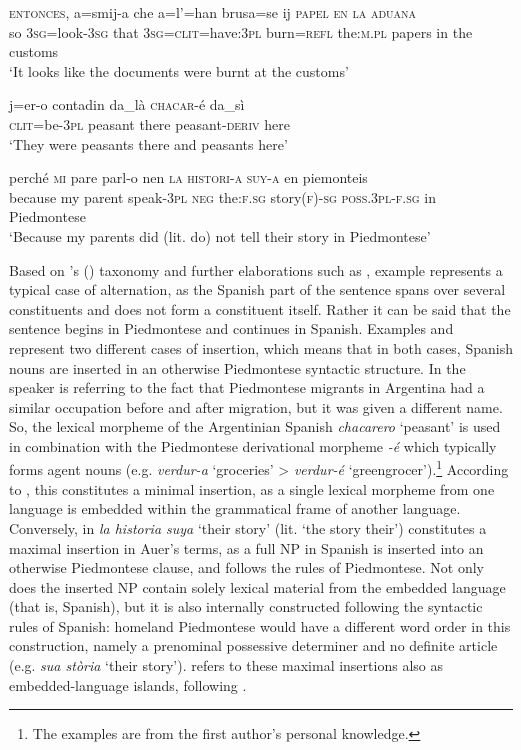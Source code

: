 \documentclass[output=paper]{langscibook}
\begin{document}
\ea\label{ex:goria:1}
  \gll \textsc{entonces}, a=smij-a che a=l'=han brusa=se ij \textsc{papel} \textsc{en} \textsc{la} \textsc{aduana}\\
  so \textsc{3sg}=look-\textsc{3sg} that  \textsc{3sg}=\textsc{clit}=have:\textsc{3pl}  burn=\textsc{refl} the:\textsc{m.pl} papers in the customs\\
  \glt ‘It looks like the documents were burnt at the customs’
\z

\ea\label{ex:goria:2}
  \gll j=er-o contadin da\_là \textsc{chacar}{}-é da\_sì\\
  \textsc{clit}=be-\textsc{3pl} peasant there peasant-\textsc{deriv} here\\
  \glt ‘They were peasants there and peasants here’
\z

\ea\label{ex:goria:3}
  \gll perché \textsc{mi} pare parl-o nen \textsc{la} \textsc{histori-a} \textsc{suy-a} en  piemonteis\\
  because my parent speak-\textsc{3pl} \textsc{neg} the:\textsc{f.sg} story(\textsc{f})-\textsc{sg}  \textsc{poss.3pl-f.sg} in Piedmontese\\
  \glt ‘Because my parents did (lit. do) not tell their story in Piedmontese’
\z

Based on \citeauthor{Muysken2000}'s (\citeyear{Muysken2000,Muysken2013}) taxonomy and further elaborations such as \citet{DeucharEtAl2007}, example  represents a typical case of alternation, as the Spanish part of the sentence spans over several constituents and does not form a constituent itself. Rather it can be said that the sentence begins in Piedmontese and continues in Spanish. Examples  and  represent two different cases of insertion, which means that in both cases, Spanish nouns are inserted in an otherwise Piedmontese syntactic structure. In  the speaker is referring to the fact that Piedmontese migrants in Argentina had a similar occupation before and after migration, but it was given a different name. So, the lexical morpheme of the Argentinian Spanish \textit{chacarero} ‘peasant’ is used in combination with the Piedmontese derivational morpheme \textit{{}-é} which typically forms agent nouns (e.g. \textit{verdur-a} ‘groceries’ > \textit{verdur-é} ‘greengrocer’).\footnote{The examples are from the first author’s personal knowledge.} According to \citet{Auer2014}, this constitutes a minimal insertion, as a single lexical morpheme from one language is embedded within the grammatical frame of another language. Conversely, in  \textit{la historia suya} ‘their story’ (lit. ‘the story their’) constitutes a maximal insertion in Auer’s terms, as a full NP in Spanish is inserted into an otherwise Piedmontese clause, and follows the rules of Piedmontese. Not only does the inserted NP contain solely lexical material from the embedded language (that is, Spanish), but it is also internally constructed following the syntactic rules of Spanish: homeland Piedmontese would have a different word order in this construction, namely a prenominal possessive determiner and no definite article (e.g. \textit{sua stòria} ‘their story’). \citet{Auer2014} refers to these maximal insertions also as embedded-language islands, following \citet{Myers-Scotton2002}.
\end{document}
